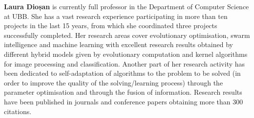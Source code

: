 \documentclass[conference]{IEEEtran}
\begin{document}
\textbf{Laura Dioșan} is currently full professor in the Department of Computer Science at UBB. She has a vast research experience participating in more than ten projects in the last 15 years, from which she coordinated three projects successfully completed. Her research areas cover evolutionary optimisation, swarm intelligence and machine learning with excellent research results obtained by different hybrid models given by evolutionary computation and kernel algorithms for image processing and classification. Another part of her research activity has been dedicated to self-adaptation of algorithms to the problem to be solved (in order to improve the quality of the solving/learning process) through the parameter optimisation and through the fusion of information. Research results have been published in journals and conference papers obtaining more than 300 citations.
\end{document}
